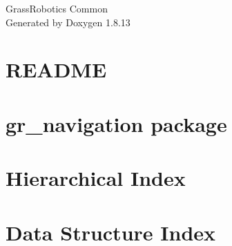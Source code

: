\documentclass[twoside]{book}
\newcommand{\+}{\discretionary{\mbox{\scriptsize$\hookleftarrow$}}{}{}}
\newcommand{\clearemptydoublepage}{%
  \newpage{\pagestyle{empty}\cleardoublepage}%
}
\begin{document}
\hypersetup{pageanchor=false,
             bookmarksnumbered=true,
             pdfencoding=unicode
            }
\begin{titlepage}
\vspace*{7cm}
\begin{center}%
{\Large Grass\+Robotics Common }\\
\vspace*{1cm}
{\large Generated by Doxygen 1.8.13}\\
\end{center}
\end{titlepage}
\clearemptydoublepage
{}
\tableofcontents
\clearemptydoublepage
{}
\hypersetup{pageanchor=true}

\chapter{R\+E\+A\+D\+ME}
\label{md__home_jose_ros_ws_src_gr_navigation_gr_map_tools_gr_map_utils_README}

\chapter{gr\+\_\+navigation package}
\label{md__home_jose_ros_ws_src_gr_navigation_README}

\chapter{Hierarchical Index}

\chapter{Data Structure Index}

\end{document}

